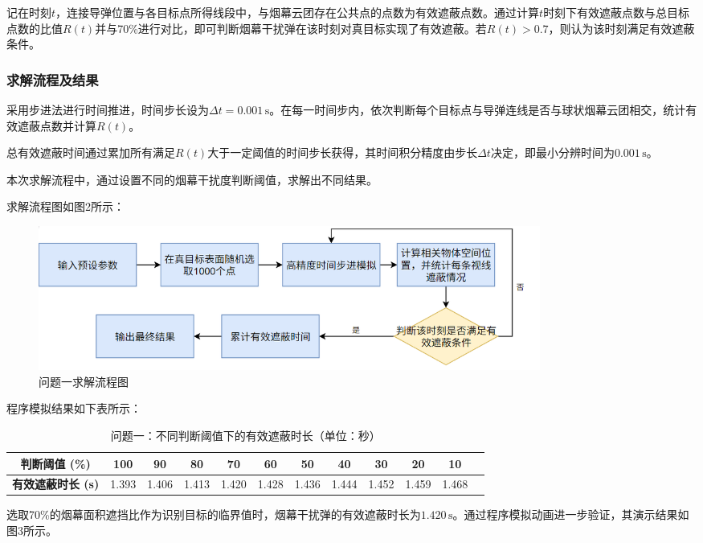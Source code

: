 \documentclass[12pt]{article}
\begin{document}
\begin{CJK}{UTF8}{gbsn}
		记在时刻$t$，连接导弹位置与各目标点所得线段中，与烟幕云团存在公共点的点数为有效遮蔽点数。通过计算$t$时刻下有效遮蔽点数与总目标点数的比值$R(t)$并与70\%进行对比，即可判断烟幕干扰弹在该时刻对真目标实现了有效遮蔽。若$R(t)>0.7$，则认为该时刻满足有效遮蔽条件。
		
		\subsubsection{求解流程及结果}
		
		采用步进法进行时间推进，时间步长设为$\Delta t = 0.001\,\mathrm{s}$。在每一时间步内，依次判断每个目标点与导弹连线是否与球状烟幕云团相交，统计有效遮蔽点数并计算$R(t)$。
		
		总有效遮蔽时间通过累加所有满足$R(t)$大于一定阈值的时间步长获得，其时间积分精度由步长$\Delta t$决定，即最小分辨时间为$0.001\,\mathrm{s}$。
		
		本次求解流程中，通过设置不同的烟幕干扰度判断阈值，求解出不同结果。
		
		求解流程图如图2所示：
		
		\begin{figure}[H]
			\centering
			\includegraphics[width=0.8\textwidth]{pic/Fg2.png}
			\caption{问题一求解流程图}
			\label{fig:flowchart_q1}
		\end{figure}
		
		程序模拟结果如下表所示：
		
		\begin{table}[H]
			\centering
			\caption{问题一：不同判断阈值下的有效遮蔽时长（单位：秒）}
			\label{tab:results_q1}
			\begin{tabular}{cccccccccccc}
				\toprule
				\textbf{判断阈值 (\%)} & \textbf{100} & \textbf{90} & \textbf{80} & \textbf{70} & \textbf{60} & \textbf{50} & \textbf{40} & \textbf{30} & \textbf{20} & \textbf{10} \\
				\midrule
				\textbf{有效遮蔽时长 (s)} & 1.393 & 1.406 & 1.413 & 1.420 & 1.428 & 1.436 & 1.444 & 1.452 & 1.459 & 1.468 \\
				\bottomrule
			\end{tabular}
		\end{table}
		
		选取70\%的烟幕面积遮挡比作为识别目标的临界值时，烟幕干扰弹的有效遮蔽时长为$1.420\,\mathrm{s}$。通过程序模拟动画进一步验证，其演示结果如图3所示。
		

\end{CJK}
\end{document}
